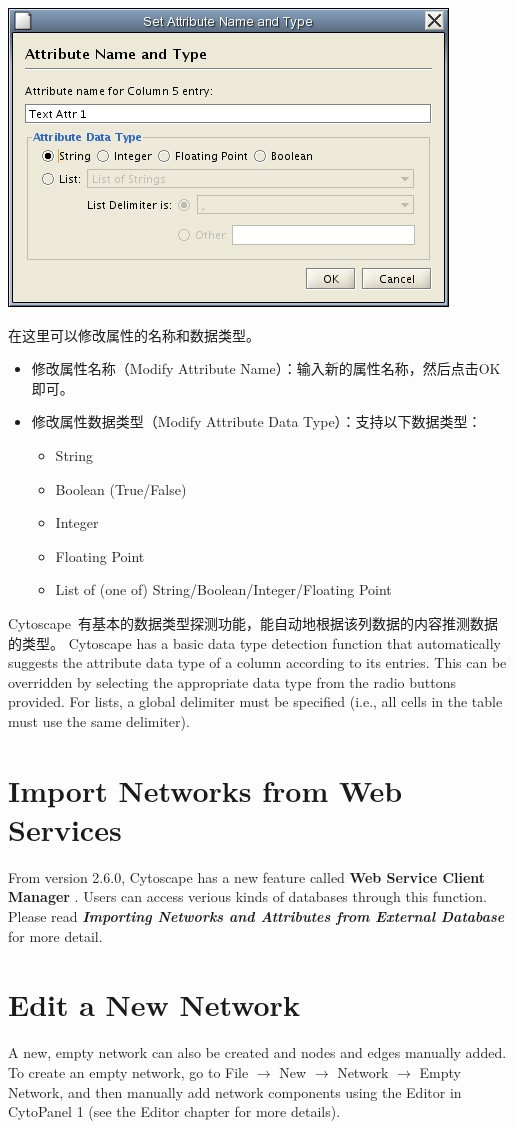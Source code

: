 \begin{center}
 \includegraphics[width=\textwidth]{images/network_table_attr_dialog1.png} 
\end{center}

在这里可以修改属性的名称和数据类型。
\begin{itemize}
\item 修改属性名称（Modify Attribute Name）：输入新的属性名称，然后点击OK即可。
\item 修改属性数据类型（Modify Attribute Data Type）：支持以下数据类型：
\begin{itemize}
\item String 
\item Boolean (True/False) 
\item Integer 
\item Floating Point 
\item List of (one of) String/Boolean/Integer/Floating Point 
\end{itemize}
\end{itemize}
Cytoscape~有基本的数据类型探测功能，能自动地根据该列数据的内容推测数据的类型。
 Cytoscape has a basic data type detection function that automatically suggests the attribute data type of a column according to its entries. This can be overridden by selecting the appropriate data type from the radio buttons provided. For lists, a global delimiter must be specified (i.e., all cells in the table must use the same delimiter). 

\section{Import Networks from Web Services}
 From version 2.6.0, Cytoscape has a new feature called \textbf{Web Service Client Manager}
. Users can access verious kinds of databases through this function. Please read \emph{\textbf{Importing Networks and Attributes from External Database}
}
 for more detail. 

\section{Edit a New Network}
 A new, empty network can also be created and nodes and edges manually added. To create an empty network, go to File $\rightarrow$ New $\rightarrow$ Network $\rightarrow$ Empty Network, and then manually add network components using the Editor in CytoPanel 1 (see the Editor chapter for more details). 
